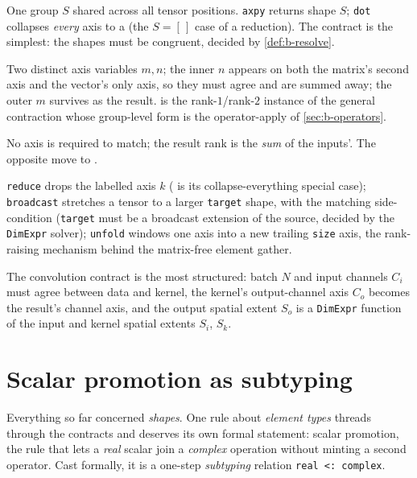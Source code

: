 \begin{description}[leftmargin=1.4em, style=nextline, nosep]
\item[Same-shape: \code{axpy}, \code{dot}.] One group $S$ shared across all tensor
positions. \lstinline[style=l4style]|axpy| returns shape $S$;
\lstinline[style=l4style]|dot| collapses \emph{every} axis to a  (the
$S=[\,]$ case of a reduction). The contract is the simplest: the shapes must be
congruent, decided by \cref{def:b-resolve}.
\item[Contraction: \code{matvec}.] Two distinct axis variables $m,n$; the inner
$n$ appears on both the matrix's second axis and the vector's only axis, so they
must agree and are summed away; the outer $m$ survives as the result.
 is the rank-$1$/rank-$2$ instance of the general contraction whose
group-level form is the operator-apply of \cref{sec:b-operators}.
\item[Rank-raising: \code{outer}.] No axis is required to match; the result rank is
the \emph{sum} of the inputs'. The opposite move to .
\item[Rank-moving: \code{reduce}, \code{broadcast}, \code{unfold}.]
\lstinline[style=l4style]|reduce| drops the labelled axis $k$ ( is its
collapse-everything special case); \lstinline[style=l4style]|broadcast| stretches a
tensor to a larger \texttt{target} shape, with the matching side-condition
(\texttt{target} must be a broadcast extension of the source, decided by the
\lstinline[style=l4style]|DimExpr| solver); \lstinline[style=l4style]|unfold|
windows one axis into a new trailing \texttt{size} axis, the rank-raising mechanism
behind the matrix-free element gather.
\item[Structured kernel: \code{conv}.] The convolution contract is the most
structured: batch $N$ and input channels $C_i$ must agree between data and kernel,
the kernel's output-channel axis $C_o$ becomes the result's channel axis, and the
output spatial extent $S_o$ is a \lstinline[style=l4style]|DimExpr| function of the
input and kernel spatial extents $S_i$, $S_k$.
\end{description}

\section{Scalar promotion as subtyping}
\label{sec:b-promotion}

Everything so far concerned \emph{shapes}. One rule about \emph{element types}
threads through the contracts and deserves its own formal statement: scalar
promotion, the rule that lets a \emph{real} scalar join a \emph{complex} operation
without minting a second operator. Cast formally, it is a one-step \emph{subtyping}
relation \lstinline[style=l4style]|real <: complex|.

